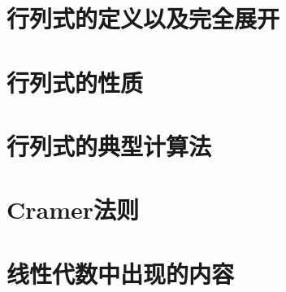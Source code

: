 
\section{行列式的定义以及完全展开}

\section{行列式的性质}

\section{行列式的典型计算法}

\section{Cramer法则}

\section{线性代数中出现的内容}

